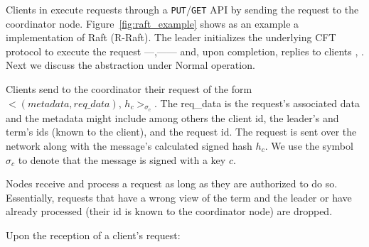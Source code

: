 Clients in \projecttitle{} execute requests through a \texttt{PUT}/\texttt{GET} API by sending the request to the coordinator node. Figure~\ref{fig:raft_example} shows as an example a \projecttitle{} implementation of Raft (R-Raft). The leader initializes the underlying CFT protocol to execute the request ---,------ and, upon completion, replies to clients , . Next we discuss the \projecttitle{} abstraction under Normal operation. %



     Clients send to the coordinator their request of the form $<(metadata, req\_data)$, $h_{c}>_{\sigma_{c}}$. The req\_data is the request's associated data and the metadata might include among others the client id, the leader's and term's ids (known to the client), and the request id. The request is sent over the network along with the message's calculated signed hash $h_{c}$. We use the symbol $\sigma_{c}$ to denote that the message is signed with a key $c$.
    
     Nodes receive and process a request as long as they are authorized to do so. Essentially, requests that have a wrong view of the term and the leader or have already processed (their id is known to the coordinator node) are dropped.
    
     Upon the reception of a client's request: 
    
